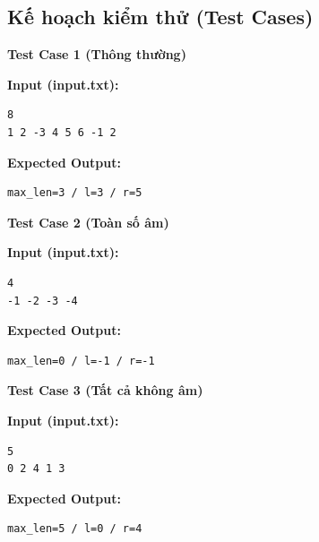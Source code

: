 \subsection{Kế hoạch kiểm thử (Test Cases)}

\textbf{Test Case 1 (Thông thường)}

\textbf{Input (input.txt):}
\begin{lstlisting}
8
1 2 -3 4 5 6 -1 2
\end{lstlisting}

\textbf{Expected Output:}
\begin{lstlisting}
max_len=3 / l=3 / r=5
\end{lstlisting}

\vspace{0.5cm}

\textbf{Test Case 2 (Toàn số âm)}

\textbf{Input (input.txt):}
\begin{lstlisting}
4
-1 -2 -3 -4
\end{lstlisting}

\textbf{Expected Output:}
\begin{lstlisting}
max_len=0 / l=-1 / r=-1
\end{lstlisting}

\vspace{0.5cm}

\textbf{Test Case 3 (Tất cả không âm)}

\textbf{Input (input.txt):}
\begin{lstlisting}
5
0 2 4 1 3
\end{lstlisting}

\textbf{Expected Output:}
\begin{lstlisting}
max_len=5 / l=0 / r=4
\end{lstlisting}